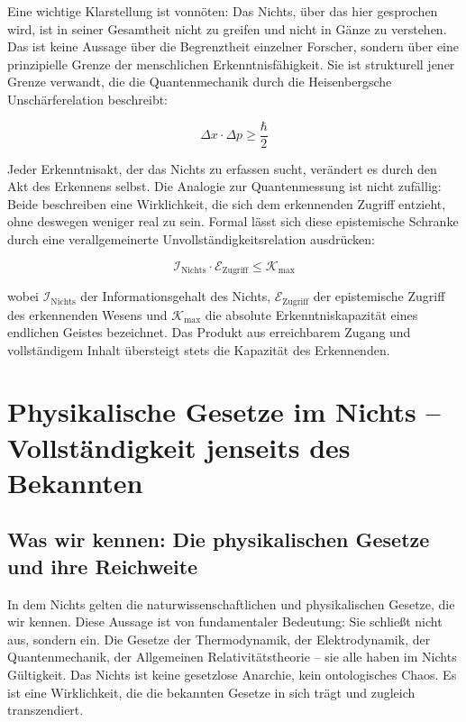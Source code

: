 ﻿\documentclass[12pt,a4paper]{report}
\begin{document}
Eine wichtige Klarstellung ist vonnöten: Das Nichts, über das hier gesprochen wird, ist in seiner Gesamtheit nicht zu greifen und nicht in Gänze zu verstehen. Das ist keine Aussage über die Begrenztheit einzelner Forscher, sondern über eine prinzipielle Grenze der menschlichen Erkenntnisfähigkeit. Sie ist strukturell jener Grenze verwandt, die die Quantenmechanik durch die Heisenbergsche Unschärferelation beschreibt:

\begin{equation}
	\Delta x \cdot \Delta p \geq \frac{\hbar}{2}
\end{equation}

Jeder Erkenntnisakt, der das Nichts zu erfassen sucht, verändert es durch den Akt des Erkennens selbst. Die Analogie zur Quantenmessung ist nicht zufällig: Beide beschreiben eine Wirklichkeit, die sich dem erkennenden Zugriff entzieht, ohne deswegen weniger real zu sein. Formal lässt sich diese epistemische Schranke durch eine verallgemeinerte Unvollständigkeitsrelation ausdrücken:

\begin{equation}
	\mathcal{I}_{\text{Nichts}} \cdot \mathcal{E}_{\text{Zugriff}} \leq \mathcal{K}_{\max}
	\label{eq:erkenntnis_schranke}
\end{equation}

wobei $\mathcal{I}_{\text{Nichts}}$ der Informationsgehalt des Nichts, $\mathcal{E}_{\text{Zugriff}}$ der epistemische Zugriff des erkennenden Wesens und $\mathcal{K}_{\max}$ die absolute Erkenntniskapazität eines endlichen Geistes bezeichnet. Das Produkt aus erreichbarem Zugang und vollständigem Inhalt übersteigt stets die Kapazität des Erkennenden.

\section{Physikalische Gesetze im Nichts -- Vollständigkeit jenseits des Bekannten}

\subsection{Was wir kennen: Die physikalischen Gesetze und ihre Reichweite}

In dem Nichts gelten die naturwissenschaftlichen und physikalischen Gesetze, die wir kennen. Diese Aussage ist von fundamentaler Bedeutung: Sie schließt nicht aus, sondern ein. Die Gesetze der Thermodynamik, der Elektrodynamik, der Quantenmechanik, der Allgemeinen Relativitätstheorie -- sie alle haben im Nichts Gültigkeit. Das Nichts ist keine gesetzlose Anarchie, kein ontologisches Chaos. Es ist eine Wirklichkeit, die die bekannten Gesetze in sich trägt und zugleich transzendiert.
\end{document}
